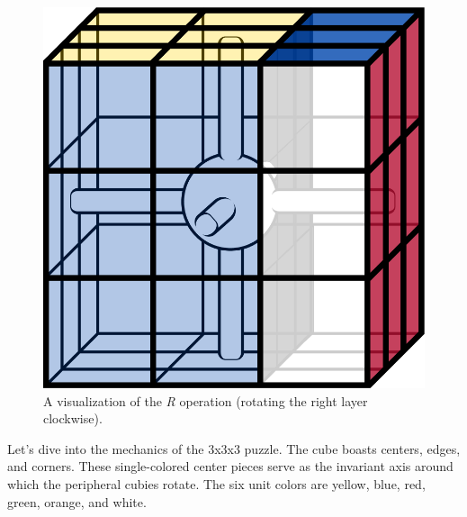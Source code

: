 \documentclass[12pt]{article}
\begin{document}
\begin{figure}[h]
\begin{minipage}[c]{0.2\textwidth}
    \end{minipage}
    \begin{minipage}[c]{0.2\textwidth}
        \includegraphics[scale=0.1]{moves/core_r_transform.png}
    \end{minipage}
    \caption{A visualization of the \textit{R} operation (rotating the right layer clockwise).}
\end{figure}

Let's dive into the mechanics of the 3x3x3 puzzle. The cube boasts centers, edges, and corners. These single-colored center pieces serve as the invariant axis around which the peripheral cubies rotate. The six unit colors are yellow, blue, red, green, orange, and white.
\end{document}

